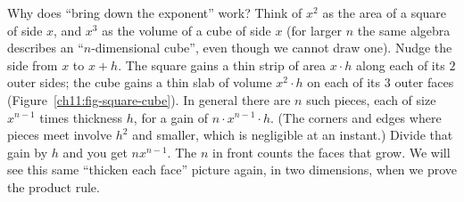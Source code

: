 \begin{whybox}
Why does ``bring down the exponent'' work? Think of $x^2$ as the area of a square of
side $x$, and $x^3$ as the volume of a cube of side $x$ (for larger $n$ the same algebra
describes an ``$n$-dimensional cube'', even though we cannot draw one). Nudge the side
from $x$ to $x+h$. The square gains a thin strip of area $x\cdot h$ along each of its
$2$ outer sides; the cube gains a thin slab of volume $x^2\cdot h$ on each of its $3$
outer faces (Figure~\ref{ch11:fig-square-cube}). In general there are $n$ such pieces,
each of size $x^{n-1}$ times thickness $h$, for a gain of $n\cdot x^{n-1}\cdot h$. (The
corners and edges where pieces meet involve $h^2$ and smaller, which is negligible at
an instant.) Divide that gain by $h$ and you get $n x^{n-1}$. The $n$ in front counts
the faces that grow. We will see this same ``thicken each face'' picture again, in two
dimensions, when we prove the product rule.
\end{whybox}


